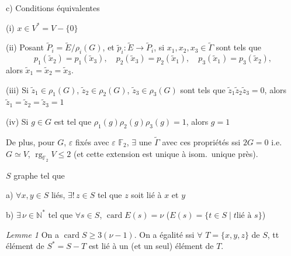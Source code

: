 \documentclass[11pt,a4paper]{article}
\begin{document}

c) Conditions équivalentes  \struck{\ill{}}

(i)  \struck{\ill{}} $x \in V^{*} = V - \lbrace 0
\rbrace$

(ii) Posant $\tilde{P}_i = \tilde{E}/\rho_i(G)$,  et
$\tilde{p}_i : \tilde{E} \to \tilde{P}_i$, si $x_1, x_2, x_3 \in \tilde{\Gamma}$
sont tels que
\[
p_1(\tilde{x}_2) = p_1(\tilde{x}_3), \quad p_2(\tilde{x}_3) =
p_2(\tilde{x}_1), \quad p_3(\tilde{x}_1) = p_3(\tilde{x}_2),
\]
alors $\tilde{x}_1 = \tilde{x}_2 = \tilde{x}_3$.

(iii) Si $\tilde{z}_1 \in \rho_1(G)$, $\tilde{z}_2 \in \rho_2(G)$, $\tilde{z}_3
\in \rho_3(G)$ sont tels que $\tilde{z}_1 \tilde{z}_2 \tilde{z}_3 = 0$, alors
$\tilde{z}_1 = \tilde{z}_2 = \tilde{z}_3 = 1$

(iv) Si $g \in G$ est tel que $\rho_1(g) \rho_2(g) \rho_3(g) = 1$, alors $g =
1$

De plus, pour $G$, $\varepsilon$ fixés avec $\varepsilon$ \uncertain{$\neq$}
$\mathbb{F}_2$, $\exists$ une $\tilde{\Gamma}$  avec ces propriétés
ssi $2G = 0$ i.e.\ $G \simeq V$, $\operatorname{rg}_{\mathbb{F}_2} V \leqslant
2$ (et cette extension est unique à isom.\ unique près).


$S$ graphe \add{$\neq \emptyset$} tel que 

a) $\forall x, y \in S$ liés, $\exists!\, z \in S$ tel que $z$ soit lié à $x$ et
$y$

b) $\exists\, \nu \in \mathbb{N}^{*}$ tel que $\forall s \in S$,
$\operatorname{card} E(s) = \nu$ \quad ($E(s) = \lbrace t \in S \mid t \text{
lié à } s \rbrace$)

 \emph{Lemme 1}  On a $\operatorname{card} S
\geqslant 3(\nu - 1)$. On a égalité ssi $\forall$  $T = \lbrace x, y, z \rbrace$ de $S$,  tt élément de
$S^{*} = S - T$ est lié à un (et un seul) élément de $T$.
\end{document}
